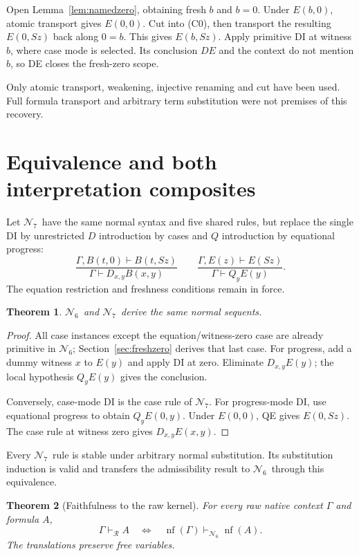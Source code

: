 \documentclass[11pt]{article}
\newtheorem{theorem}{Theorem}[section]
\theoremstyle{definition}
\newcommand{\Raw}{\ensuremath{\mathcal R}}
\newcommand{\Six}{\ensuremath{\mathcal N_6}}
\newcommand{\Seven}{\ensuremath{\mathcal N_7}}
\newcommand{\nf}[1]{\operatorname{nf}(#1)}
\newcommand{\rulename}[1]{\textup{\textsc{#1}}}
\begin{document}
Open Lemma~\ref{lem:namedzero}, obtaining fresh $b$ and $b=0$.
Under $E(b,0)$, atomic transport gives $E(0,0)$.
Cut into (C0), then transport the resulting $E(0,Sz)$ back along
$0=b$. This gives $E(b,Sz)$.
Apply primitive \rulename{DI} at witness $b$, where case mode is
selected. Its conclusion $D E$ and the context do not mention $b$,
so \rulename{DE} closes the fresh-zero scope.

Only atomic transport, weakening, injective renaming and cut have
been used. Full formula transport and arbitrary term substitution
were not premises of this recovery.

\section{Equivalence and both interpretation composites}
\label{sec:equivalence}

Let \Seven\ have the same normal syntax and five shared rules, but
replace the single \rulename{DI} by unrestricted $D$ introduction by
cases and $Q$ introduction by equational progress:
\[
 \frac{\Gamma,B(t,0)\vdash B(t,Sz)}
      {\Gamma\vdash D_{x,y}B(x,y)}
 \qquad
 \frac{\Gamma,E(z)\vdash E(Sz)}
      {\Gamma\vdash Q_yE(y)}.
\]
The equation restriction and freshness conditions remain in force.

\begin{theorem}
\label{thm:sixseven}
\Six\ and \Seven\ derive the same normal sequents.
\end{theorem}

\begin{proof}
All case instances except the equation/witness-zero case are already
primitive in \Six; Section~\ref{sec:freshzero} derives that last case.
For progress, add a dummy witness $x$ to $E(y)$ and apply
\rulename{DI} at zero. Eliminate $D_{x,y}E(y)$; the local hypothesis
$Q_yE(y)$ gives the conclusion.

Conversely, case-mode \rulename{DI} is the case rule of \Seven.
For progress-mode \rulename{DI}, use equational progress to obtain
$Q_yE(0,y)$. Under $E(0,0)$, \rulename{QE} gives $E(0,Sz)$.
The case rule at witness zero gives $D_{x,y}E(x,y)$.
\end{proof}

Every \Seven\ rule is stable under arbitrary normal substitution.
Its substitution induction is valid and transfers the admissibility
result to \Six\ through this equivalence.

\begin{theorem}[Faithfulness to the raw kernel]
\label{thm:faith}
For every raw native context $\Gamma$ and formula $A$,
\[
 \Gamma\vdash_{\Raw}A
 \quad\Longleftrightarrow\quad
 \nf{\Gamma}\vdash_{\Six}\nf{A}.
 \tag{F}
\]
The translations preserve free variables.
\end{theorem}
\end{document}
